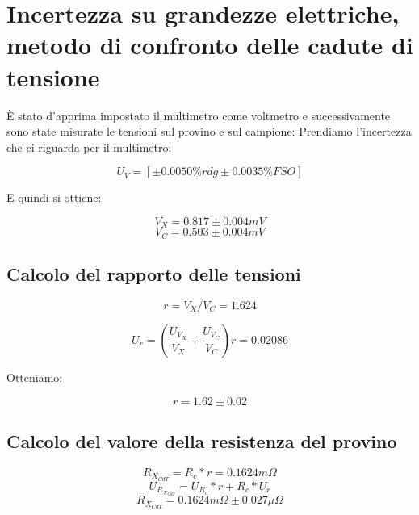 \documentclass[a4paper]{article}
\begin{document}
\section {Incertezza su grandezze elettriche, metodo di confronto delle cadute di tensione}
È stato d'apprima impostato il multimetro come voltmetro e successivamente sono state misurate le tensioni sul provino e sul campione:
Prendiamo l'incertezza che ci riguarda per il multimetro:

\begin{Large} 
	\begin{equation}
		U_{V} = [\pm 0.0050\%rdg \pm 0.0035\% FSO]
	 \end{equation}
\end{Large}
E quindi si ottiene:
\begin{Large} 
	\begin{equation}
		V_X = 0.817 \pm 0.004 mV
	 \end{equation}
	 \begin{equation}
		V_C = 0.503 \pm 0.004 mV
	 \end{equation}
\end{Large}
\subsection{Calcolo del rapporto delle tensioni}
\begin{Large}
	\begin{equation}
		r = {V_X}/{V_C}= 1.624
	 \end{equation}
\end{Large}
\begin{Large} 
	 \begin{equation}
		U_{r} = (\frac{U_{V_X}}{V_X}+\frac{U_{V_C}}{V_C})r = 0.02086
	 \end{equation}
\end{Large}
Otteniamo:
\begin{Large} 
	\begin{equation}
		r = 1.62 \pm 0.02
	 \end{equation}
\end{Large}
\subsection{Calcolo del valore della resistenza del provino}
\begin{Large} 
	\begin{equation}
		R_{X_{CdT}} = R_c* r = 0.1624 m\Omega
	 \end{equation}
	 \begin{equation}
		U_{R_{X_{CdT}}} = U_{R_c}*r+R_c*U_r
	 \end{equation}
	 \begin{equation}
		R_{X_{CdT}} = 0.1624 m\Omega \pm 0.027 \mu\Omega
	 \end{equation}
\end{Large}
\end{document}
